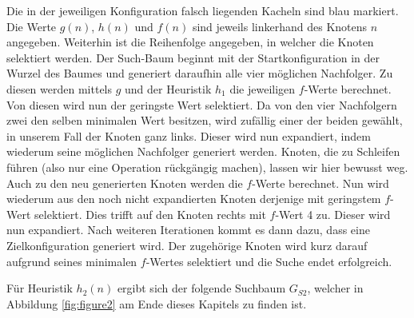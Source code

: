 Die in der jeweiligen Konfiguration falsch liegenden Kacheln sind blau markiert. Die Werte $g(n)$, $h(n)$ und $f(n)$ sind jeweils linkerhand des Knotens $n$ angegeben. Weiterhin ist die Reihenfolge angegeben, in welcher die Knoten selektiert werden.
Der Such-Baum beginnt mit der Startkonfiguration in der Wurzel des Baumes und generiert daraufhin alle vier möglichen Nachfolger. Zu diesen werden mittels $g$ und der Heuristik $h_{1}$ die jeweiligen $f$-Werte berechnet. Von diesen wird nun der geringste Wert selektiert. Da von den vier Nachfolgern zwei den selben minimalen Wert besitzen, wird zufällig einer der beiden gewählt, in unserem Fall der Knoten ganz links. Dieser wird nun expandiert, indem wiederum seine möglichen Nachfolger generiert werden. Knoten, die zu Schleifen führen (also nur eine Operation rückgängig machen), lassen wir hier bewusst weg. Auch zu den neu generierten Knoten werden die $f$-Werte berechnet. Nun wird wiederum aus den noch nicht expandierten Knoten derjenige mit geringstem $f$-Wert selektiert. Dies trifft auf den Knoten rechts mit $f$-Wert 4 zu. Dieser wird nun expandiert. Nach weiteren Iterationen kommt es dann dazu, dass eine Zielkonfiguration generiert wird. Der zugehörige Knoten wird kurz darauf aufgrund seines minimalen $f$-Wertes selektiert und die Suche endet erfolgreich.

Für Heuristik $h_{2}(n)$ ergibt sich der folgende Suchbaum $G_{S2}$, welcher in Abbildung \ref{fig:figure2} am Ende dieses Kapitels zu finden ist.

